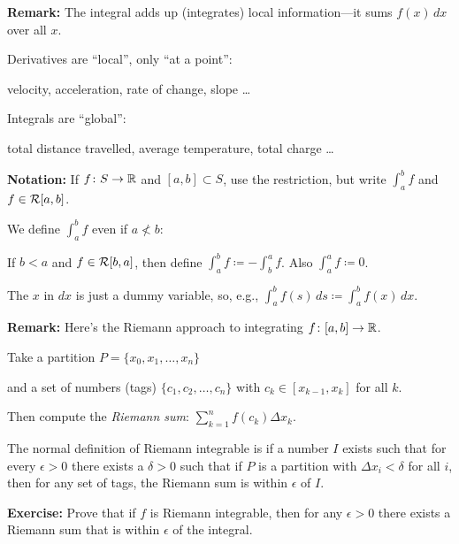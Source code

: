 \documentclass[10pt,aspectratio=149]{beamer}
\begin{document}
\begin{frame}

\textbf{Remark:}
The integral adds up (integrates) local information---it sums $f(x)\,dx$ over all $x$.

\pause
\medskip

Derivatives are ``local'', only ``at a point'':

velocity, acceleration, rate of change,
slope \ldots

\pause
\medskip

Integrals are ``global'':

total distance travelled, average temperature,
total charge \ldots

\pause
\medskip

\textbf{Notation:}
If $f \colon S \to {\mathbb{R}}$ and $[a,b] \subset S$,
use the restriction, but write $\int_a^b f$ and $f \in {\mathcal{R}}[a,b]$.

\pause
\medskip

We define $\int_a^b f$ even if $a \not< b$:

\pause
\medskip

If $b < a$ and $f \in {\mathcal{R}}[b,a]$,
then define
\quad
$\displaystyle
\int_a^b f \coloneqq - \int_b^a f$.
\quad
\pause
Also
\quad
$\displaystyle
\int_a^a f \coloneqq 0$.

\pause
\medskip

The $x$ in $dx$ is just a dummy variable,
so, e.g.,
\quad
$\displaystyle
\int_a^b f(s)\,ds \coloneqq \int_a^b f(x)\,dx$.

\end{frame}

\begin{frame}

\textbf{Remark:}
Here's the Riemann approach to integrating
$f \colon [a,b] \to {\mathbb{R}}$.

\pause
Take a partition
$P = \{ x_0, x_1, \ldots, x_n \}$

\pause
and a set of numbers (tags) $\{ c_1, c_2, \ldots, c_n \}$ with
$c_k \in [x_{k-1},x_k]$ for all $k$.

\pause
Then compute the \emph{Riemann sum}:
\quad
$\displaystyle
\sum_{k=1}^n f(c_k) \Delta x_k$.

\pause
\medskip

The normal definition of Riemann integrable is if a number $I$
exists such that for every $\epsilon > 0$ there exists a
$\delta > 0$ such that if $P$ is a partition with $\Delta x_i < \delta$
for all $i$, then for any set of tags,
the Riemann sum is within $\epsilon$ of $I$.

\pause
\medskip

\textbf{Exercise:}
Prove that if $f$ is Riemann integrable, then for any $\epsilon > 0$
there exists a Riemann sum that is within $\epsilon$ of the integral.

\end{frame}
\end{document}
